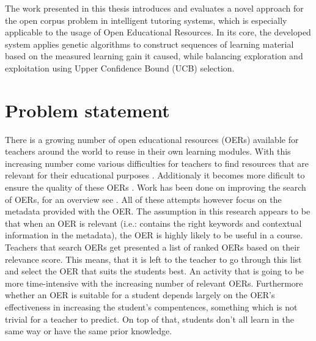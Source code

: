The work presented in this thesis introduces and evaluates a novel approach for
the open corpus problem in intelligent tutoring systems, which is especially
applicable to the usage of Open Educational Resources.
In its core, the developed system applies genetic algorithms to construct
sequences of learning material based on the measured learning gain it caused,
while balancing exploration and exploitation using Upper Confidence Bound (UCB)
selection.


\section{Problem statement}
There is a growing number of open educational resources (OERs) available for
teachers around the world to reuse in their own learning modules. With this
increasing number come various difficulties for teachers to find resources that
are relevant for their educational purposes \citep{Ochoa2011}. Additionaly it
becomes more dificult to ensure the quality of these OERs \citep{Cechinel2011}.
Work has been done on improving the search of OERs, for an overview see
\citep{Ochoa2008}. All of these attempts however focus on the metadata provided
with the OER. The assumption in this research appears to be that when an OER is
relevant (i.e.: contains the right keywords and contextual information in the
metadata), the OER is highly likely to be useful in a course. Teachers that
search OERs get presented a list of ranked OERs based on their relevance score.
This means, that it is left to the teacher to go through this list and select
the OER that suits the students best. An activity that is going to be more
time-intensive with the increasing number of relevant OERs. Furthermore whether
an OER is suitable for a student depends largely on the OER’s effectiveness in
increasing the student’s compentences, something which is not trivial for a
teacher to predict. On top of that, students don't all learn in the same way or
have the same prior knowledge.

